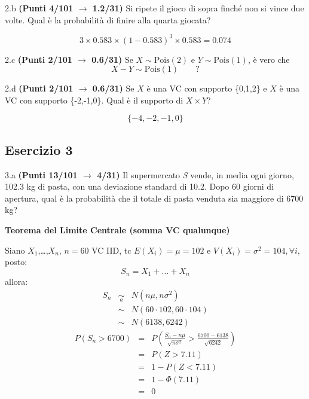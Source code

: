 \documentclass[
  11pt,
]{book}
\theoremstyle{mytheoremstyle}
\theoremstyle{mydefstyle}
\newenvironment{sol}
  {
  \begin{tcolorbox}[enhanced,breakable,arc=0.1mm,boxrule=1pt,colback=white,colframe=iblue,
  title=\bf \fontfamily{lmss}\selectfont \hspace{.5 cm} Soluzione,drop fuzzy shadow]

}{
\end{tcolorbox}
  }
\begin{document}
2.b \textbf{(Punti 4/101 \(\rightarrow\) 1.2/31)} Si ripete il gioco di sopra finché non si vince due volte. Qual è la probabilità di finire alla quarta giocata?

\begin{sol}
\[
3\times 0.583\times (1-0.583)^3\times 0.583 = 0.074
\]

\end{sol}

2.c \textbf{(Punti 2/101 \(\rightarrow\) 0.6/31)} Se \(X\sim \text{Pois}(2)\) e \(Y\sim\text{Pois}(1)\), è vero che
\[
X-Y\sim\text{Pois}(1)\qquad ?
\]

2.d \textbf{(Punti 2/101 \(\rightarrow\) 0.6/31)} Se \(X\) è una VC con supporto \{0,1,2\} e \(X\) è una VC con supporto \{-2,-1,0\}.
Qual è il supporto di \(X\times Y\)?

\[
\{-4,-2,-1,0\}
\]

\subsection{Esercizio 3}\label{esercizio-3-14}

3.a \textbf{(Punti 13/101 \(\rightarrow\) 4/31)} Il supermercato \emph{S} vende, in media ogni giorno, 102.3 kg di pasta, con una deviazione standard di 10.2. Dopo 60 giorni di apertura, qual è la probabilità che il totale di pasta venduta sia maggiore di 6700 kg?

\textbf{Teorema del Limite Centrale (somma VC qualunque)}

Siano \(X_1\),\ldots,\(X_n\), \(n=60\) VC IID, tc \(E(X_i)=\mu=102\) e \(V(X_i)=\sigma^2=104,\forall i\), posto:
\[
      S_n = X_1 + ... + X_n
      \]
allora:\begin{eqnarray*}
  S_n & \mathop{\sim}\limits_{a}& N(n\mu,n\sigma^2) \\
     &\sim & N(60\cdot102,60\cdot104) \\
     &\sim & N(6138,6242) 
  \end{eqnarray*}\begin{eqnarray*}
      P( S_n   >   6700 ) 
        &=& P\left(  \frac { S_n  -  n\mu }{ \sqrt{n\sigma^2} }  >  \frac { 6700  -  6138 }{\sqrt{ 6242 }} \right)  \\
                 &=& P\left(  Z   >   7.11 \right) \\    &=& 1-P(Z< 7.11 )\\ 
                 &=&  1-\Phi( 7.11 ) \\ &=&  0 
      \end{eqnarray*}
\end{document}
